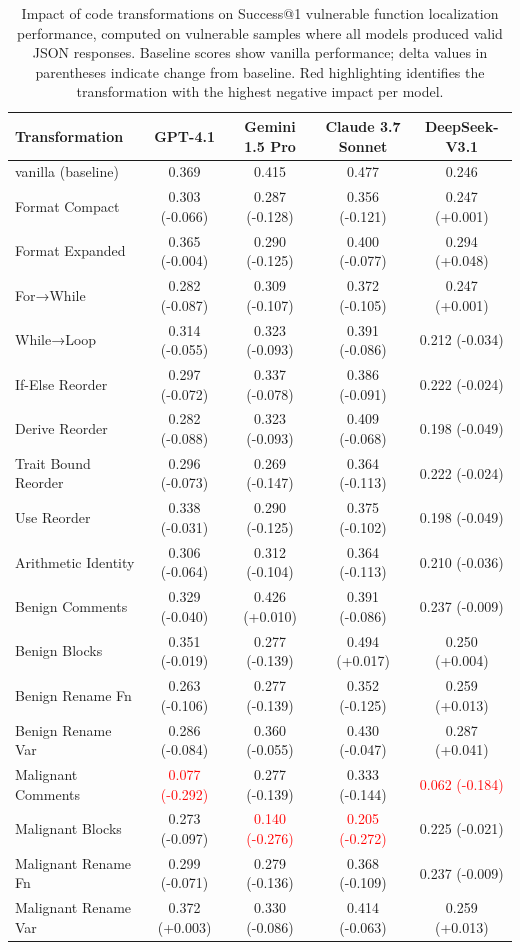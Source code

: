 \begin{table}[htbp]
\centering
\caption{Impact of code transformations on Success@1 vulnerable function localization performance, computed on vulnerable samples where all models produced valid JSON responses. Baseline scores show vanilla performance; delta values in parentheses indicate change from baseline. Red highlighting identifies the transformation with the highest negative impact per model.}
\label{tab:transformation_impact}
\begin{tabular}{lcccc}
\toprule
\textbf{Transformation} & \textbf{GPT-4.1} & \textbf{Gemini 1.5 Pro} & \textbf{Claude 3.7 Sonnet} & \textbf{DeepSeek-V3.1} \\
\midrule
vanilla (baseline) & 0.369 & 0.415 & 0.477 & 0.246 \\
\addlinespace[4pt]
Format Compact & 0.303 (-0.066) & 0.287 (-0.128) & 0.356 (-0.121) & 0.247 (+0.001) \\
Format Expanded & 0.365 (-0.004) & 0.290 (-0.125) & 0.400 (-0.077) & 0.294 (+0.048) \\
\addlinespace[2pt]
For→While & 0.282 (-0.087) & 0.309 (-0.107) & 0.372 (-0.105) & 0.247 (+0.001) \\
While→Loop & 0.314 (-0.055) & 0.323 (-0.093) & 0.391 (-0.086) & 0.212 (-0.034) \\
If-Else Reorder & 0.297 (-0.072) & 0.337 (-0.078) & 0.386 (-0.091) & 0.222 (-0.024) \\
Derive Reorder & 0.282 (-0.088) & 0.323 (-0.093) & 0.409 (-0.068) & 0.198 (-0.049) \\
Trait Bound Reorder & 0.296 (-0.073) & 0.269 (-0.147) & 0.364 (-0.113) & 0.222 (-0.024) \\
Use Reorder & 0.338 (-0.031) & 0.290 (-0.125) & 0.375 (-0.102) & 0.198 (-0.049) \\
Arithmetic Identity & 0.306 (-0.064) & 0.312 (-0.104) & 0.364 (-0.113) & 0.210 (-0.036) \\
\addlinespace[4pt]
Benign Comments & 0.329 (-0.040) & 0.426 (+0.010) & 0.391 (-0.086) & 0.237 (-0.009) \\
Benign Blocks & 0.351 (-0.019) & 0.277 (-0.139) & 0.494 (+0.017) & 0.250 (+0.004) \\
\addlinespace[2pt]
Benign Rename Fn & 0.263 (-0.106) & 0.277 (-0.139) & 0.352 (-0.125) & 0.259 (+0.013) \\
Benign Rename Var & 0.286 (-0.084) & 0.360 (-0.055) & 0.430 (-0.047) & 0.287 (+0.041) \\
\addlinespace[4pt]
Malignant Comments & \textcolor{red}{0.077 (-0.292)} & 0.277 (-0.139) & 0.333 (-0.144) & \textcolor{red}{0.062 (-0.184)} \\
Malignant Blocks & 0.273 (-0.097) & \textcolor{red}{0.140 (-0.276)} & \textcolor{red}{0.205 (-0.272)} & 0.225 (-0.021) \\
\addlinespace[2pt]
Malignant Rename Fn & 0.299 (-0.071) & 0.279 (-0.136) & 0.368 (-0.109) & 0.237 (-0.009) \\
Malignant Rename Var & 0.372 (+0.003) & 0.330 (-0.086) & 0.414 (-0.063) & 0.259 (+0.013) \\
\bottomrule
\end{tabular}
\end{table}